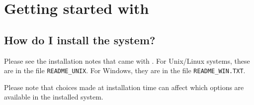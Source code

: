%
% 
% 
% 
% 
%
%
%
%

\newcommand{\guitext}[1]{\mbox{\texttt{#1}}}
\newcommand{\keyboard}[1]{{\texttt{#1}}}
\newcommand{\menu}[1]{\guitext{#1}}
\newcommand{\menuopt}[1]{\guitext{#1}}
\newcommand{\button}[1]{\guitext{#1}}

\newcommand{\ignore}[1]{}

\chapter{Getting started with {\eclipse}}
\label{chapusing}

\section{How do I install the {\eclipse} system?}
Please see the installation notes that came with {\eclipse}.
For Unix/Linux systems, these are in the file \texttt{README_UNIX}.
For Windows, they are in the file \texttt{README_WIN.TXT}.

Please note that choices made at installation time can affect which options
are available in the installed system.

